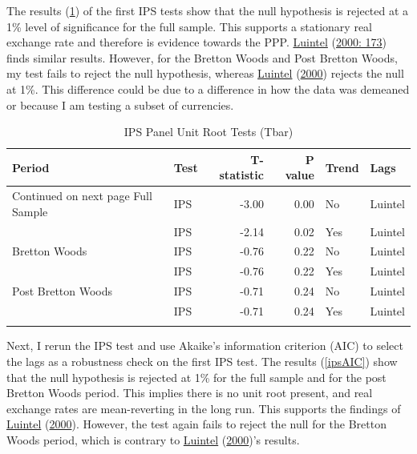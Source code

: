 \documentclass[11pt,preprint, authoryear]{elsarticle}
\numberwithin{equation}{section}
\numberwithin{figure}{section}
\numberwithin{table}{section}
\begin{document}
The results (\ref{ips}) of the first IPS tests show that the null
hypothesis is rejected at a 1\% level of significance for the full
sample. This supports a stationary real exchange rate and therefore is
evidence towards the PPP. \protect\hyperlink{ref-Kul}{Luintel}
(\protect\hyperlink{ref-Kul}{2000: 173}) finds similar results. However,
for the Bretton Woods and Post Bretton Woods, my test fails to reject
the null hypothesis, whereas \protect\hyperlink{ref-Kul}{Luintel}
(\protect\hyperlink{ref-Kul}{2000}) rejects the null at 1\%. This
difference could be due to a difference in how the data was demeaned or
because I am testing a subset of currencies.

\begingroup\fontsize{12pt}{13pt}\selectfont
\begin{longtable}{llrrll}
\caption{IPS Panel Unit Root Tests (Tbar)} \\ 
  \toprule
Period & Test & T-statistic & P value & Trend & Lags \\ 
  \hline 
\endhead 
\hline 
{\footnotesize Continued on next page} 
\endfoot 
\endlastfoot 
 \midrule
Full Sample & IPS & -3.00 & 0.00 & No & Luintel \\ 
   & IPS & -2.14 & 0.02 & Yes & Luintel \\ 
  Bretton Woods & IPS & -0.76 & 0.22 & No & Luintel \\ 
   & IPS & -0.76 & 0.22 & Yes & Luintel \\ 
  Post Bretton Woods & IPS & -0.71 & 0.24 & No & Luintel \\ 
   & IPS & -0.71 & 0.24 & Yes & Luintel \\ 
   \bottomrule
\label{ips}
\end{longtable}
\endgroup

Next, I rerun the IPS test and use Akaike's information criterion (AIC)
to select the lags as a robustness check on the first IPS test. The
results (\ref{ipsAIC}) show that the null hypothesis is rejected at 1\%
for the full sample and for the post Bretton Woods period. This implies
there is no unit root present, and real exchange rates are
mean-reverting in the long run. This supports the findings of
\protect\hyperlink{ref-Kul}{Luintel}
(\protect\hyperlink{ref-Kul}{2000}). However, the test again fails to
reject the null for the Bretton Woods period, which is contrary to
\protect\hyperlink{ref-Kul}{Luintel}
(\protect\hyperlink{ref-Kul}{2000})'s results.
\end{document}
